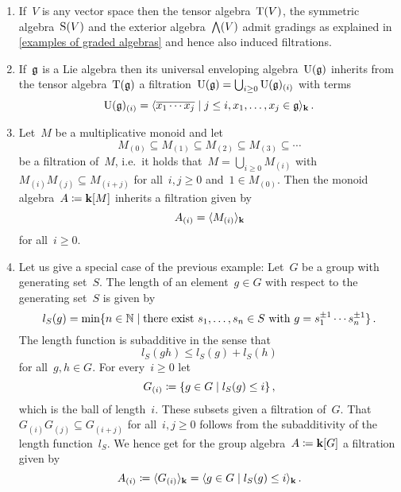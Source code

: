 \begin{examples}
  \leavevmode
  \begin{enumerate}
    \item
      If~$V$ is any vector space then the tensor algebra~$\operatorname{T}(V)$, the symmetric algebra~$\operatorname{S}(V)$ and the exterior algebra~$\bigwedge(V)$ admit gradings as explained in \cref{examples of graded algebras} and hence also induced filtrations.
    \item
      If~$\mathfrak{g}$ is a Lie algebra then its universal enveloping algebra~$\operatorname{U}(\mathfrak{g})$ inherits from the tensor algebra~$\operatorname{T}(\mathfrak{g})$ a filtration~$\operatorname{U}(\mathfrak{g}) = \bigcup_{i \geq 0} \operatorname{U}(\mathfrak{g})_{(i)}$ with terms
      \[
        \Univ(\glie)_{(i)}
        =
        \gen{
          \class{x_1 \dotsm x_j}
        \suchthat
          j \leq i,
          x_1, \dotsc, x_j \in \glie
        }_{\kf} \,.
      \]
    \item
      Let~$M$ be a multiplicative monoid and let
      \[
        M_{(0)}
        \subseteq
        M_{(1)}
        \subseteq
        M_{(2)}
        \subseteq
        M_{(3)}
        \subseteq
        \dotsb
      \]
      be a filtration of~$M$, i.e.\ it holds that~$M = \bigcup_{i \geq 0} M_{(i)}$ with~$M_{(i)} M_{(j)} \subseteq M_{(i+j)}$ for all~$i, j \geq 0$ and~$1 \in M_{(0)}$.
      Then the monoid algebra~$A \coloneqq \mathbf{k}[M]$ inherits a filtration given by
      \[
        A_{(i)}
        =
        \langle M_{(i)} \rangle_{\mathbf{k}}
      \]
      for all~$i \geq 0$.
    \item
      Let us give a special case of the previous example:
      Let~$G$ be a group with generating set~$S$.
      The length of an element~$g \in G$ with respect to the generating set~$S$ is given by
      \[
        l_S(g)
        =
        \min
        \{
          n \in \Natural
        \suchthat
          \text{there exist~$s_1, \dotsc, s_n \in S$ with~$g = s_1^{\pm 1} \dotsm s_n^{\pm 1}$}
        \}  \,.
      \]
      The length function is subadditive in the sense that
      \[
        l_S(gh)
        \leq
        l_S(g) + l_S(h)
      \]
      for all~$g, h \in G$.
      For every~$i \geq 0$ let
      \[
        G_{(i)}
        \defined
        \{
          g \in G
        \suchthat
          l_S(g) \leq i
        \}  \,,
      \]
      which is the ball of length~$i$.
      These subsets given a filtration of~$G$.
      That~$G_{(i)} G_{(j)} \subseteq G_{(i+j)}$ for all~$i, j \geq 0$ follows from the subadditivity of the length function~$l_S$.
      We hence get for the group algebra~$A \coloneqq \mathbf{k}[G]$ a filtration given by
      \[
        A_{(i)}
        \defined
        \gen{ G_{(i)} }_{\kf}
        =
        \gen{
          g \in G
        \suchthat
          l_S(g) \leq i
        }_{\kf} \,.
      \]
  \end{enumerate}
\end{examples}


